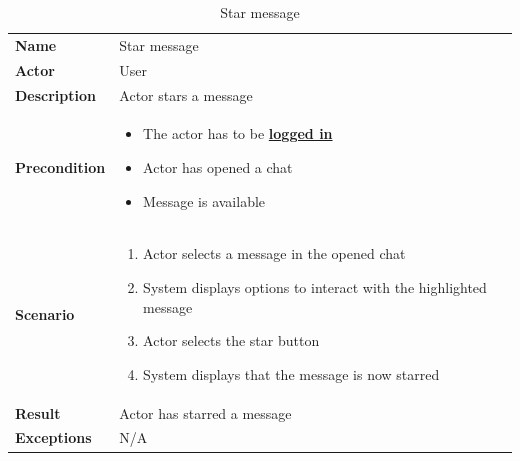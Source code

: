 \begin{table}[ht]
    \caption{Star message}
    \begin{tabular}{|L{5cm}|L{10cm}|}
        \toprule
        \textbf{Name}        & Star message                \\
        \textbf{Actor}       & User                        \\
        \textbf{Description} & Actor stars a message       \\
        \textbf{Precondition} &
        \vspace{-0.75cm}
        \begin{itemize}
            \setlength\itemsep{-0.5em}
            \item The actor has to be \textbf{\hyperref[tab:table8]{logged in}}
            \item Actor has opened a chat
            \item Message is available
        \end{itemize} \\[-0.5cm]
        \textbf{Scenario} &
        \vspace{-0.75cm}
        \begin{enumerate}
            \setlength\itemsep{-0.5em}
            \item Actor selects a message in the opened chat
            \item System displays options to interact with the highlighted message
            \item Actor selects the star button
            \item System displays that the message is now starred
        \end{enumerate} \\[-0.5cm]
        \textbf{Result}      & Actor has starred a message \\
        \textbf{Exceptions}  & N/A                         \\
        \bottomrule
    \end{tabular}
    \label{tab:table22}
\end{table}
